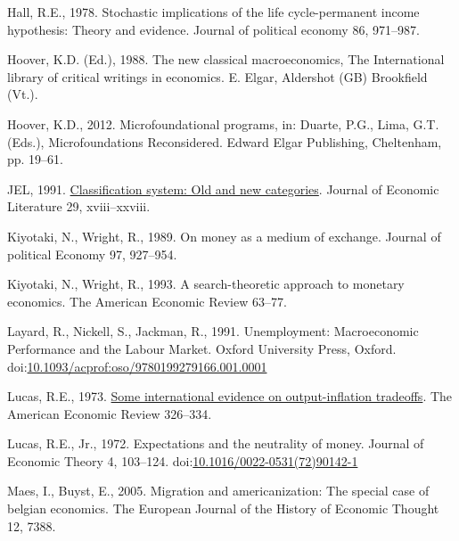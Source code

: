 \documentclass[]{elsarticle} %
\newlength{\cslhangindent}
\newlength{\cslentryspacingunit} %
\newenvironment{CSLReferences}[2] %
 {%
  \setlength{\parindent}{0pt}
  \ifodd #1
  \let\oldpar\par
  \def\par{\hangindent=\cslhangindent\oldpar}
  \fi
  \setlength{\parskip}{#2\cslentryspacingunit}
 }%
 {}
\begin{document}
\begin{CSLReferences}{1}{0}
\leavevmode{}%
Hall, R.E., 1978. Stochastic implications of the life cycle-permanent
income hypothesis: Theory and evidence. Journal of political economy 86,
971--987.

\leavevmode{}%
Hoover, K.D. (Ed.), 1988. The new classical macroeconomics, The
{International} library of critical writings in economics. E. Elgar,
Aldershot (GB) Brookfield (Vt.).

\leavevmode{}%
Hoover, K.D., 2012. Microfoundational programs, in: Duarte, P.G., Lima,
G.T. (Eds.), Microfoundations {Reconsidered}. Edward Elgar Publishing,
Cheltenham, pp. 19--61.

\leavevmode{}%
JEL, 1991. \href{https://www.jstor.org/stable/2727351}{Classification
system: Old and new categories}. Journal of Economic Literature 29,
xviii--xxviii.

\leavevmode{}%
Kiyotaki, N., Wright, R., 1989. On money as a medium of exchange.
Journal of political Economy 97, 927--954.

\leavevmode{}%
Kiyotaki, N., Wright, R., 1993. A search-theoretic approach to monetary
economics. The American Economic Review 63--77.

\leavevmode{}%
Layard, R., Nickell, S., Jackman, R., 1991. Unemployment: {Macroeconomic
Performance} and the {Labour Market}. {Oxford University Press},
{Oxford}.
doi:\href{https://doi.org/10.1093/acprof:oso/9780199279166.001.0001}{10.1093/acprof:oso/9780199279166.001.0001}

\leavevmode{}%
Lucas, R.E., 1973. \href{http://www.jstor.org/stable/1914364}{Some
international evidence on output-inflation tradeoffs}. The American
Economic Review 326--334.

\leavevmode{}%
Lucas, R.E., Jr., 1972. Expectations and the neutrality of money.
Journal of Economic Theory 4, 103--124.
doi:\href{https://doi.org/10.1016/0022-0531(72)90142-1}{10.1016/0022-0531(72)90142-1}

\leavevmode{}%
Maes, I., Buyst, E., 2005. Migration and americanization: The special
case of belgian economics. The European Journal of the History of
Economic Thought 12, 7388.


\end{CSLReferences}
\end{document}
